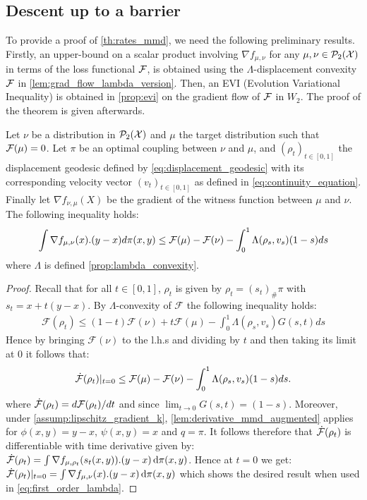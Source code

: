 \subsection{Descent up to a barrier}

To provide a proof of \cref{th:rates_mmd}, we need the following preliminary results. Firstly, an upper-bound on a scalar product involving $\nabla f_{\mu, \nu}$ for any $\mu, \nu \in \mathcal{P}_2({{\mathcal X}})$ in terms of the loss functional ${{\mathcal F}}$, is obtained using the $\Lambda$-displacement convexity ${{\mathcal F}}$ in \cref{lem:grad_flow_lambda_version}. Then, an EVI (Evolution Variational Inequality) is obtained in \cref{prop:evi} on the gradient flow of ${{\mathcal F}}$ in $W_2$. The proof of the theorem is given afterwards.


\begin{lemma}	\label{lem:grad_flow_lambda_version}
	Let $\nu$ be a distribution in $\mathcal{P}_2({{\mathcal X}})$ and $\mu$ the target distribution such that ${{\mathcal F}}(\mu)=0$.  Let $\pi$ be an optimal coupling between $\nu$ and $\mu$, and $(\rho_t)_{t \in [0,1]}$ the displacement geodesic defined by \cref{eq:displacement_geodesic} with its corresponding velocity vector  $(v_t)_{t\in[0,1]}$ as defined in \cref{eq:continuity_equation}. Finally let $\nabla f_{\nu,\mu}(X)$ be the gradient of the witness function between $\mu$ and $\nu$. The following inequality holds: %
	\begin{align*}
	\int \nabla f_{\mu, \nu}(x).(y-x) d\pi(x,y)
	\leq
	{{\mathcal F}}(\mu)- {{\mathcal F}}(\nu) -\int_0^1 \Lambda(\rho_s,v_s)(1-s)ds
	\end{align*}
	where $\Lambda$ is defined \cref{prop:lambda_convexity}.
\end{lemma}
\begin{proof}
	Recall that for all $t\in[0,1]$, $\rho_t$ is given by $\rho_t = (s_t)_{\#}\pi$ with $s_t = x + t(y-x)$. By $\Lambda$-convexity of $\mathcal{F}$ the following inequality holds:
	\begin{align*}
	\mathcal{F}(\rho_{t})\leq (1-t)\mathcal{F}(\nu)+t \mathcal{F}(\mu) - \int_0^1 \Lambda(\rho_s,v_s)G(s,t)ds
	\end{align*}
	Hence by bringing $\mathcal{F}(\nu)$ to the l.h.s and dividing by $t$ and then taking its limit at $0$ it follows that:
	\begin{align}\label{eq:first_order_lambda}
	\dot{{{\mathcal F}}}(\rho_t)\vert_{t=0}\leq \mathcal	{F}(\mu)-\mathcal{F}(\nu)-\int_0^1 \Lambda(\rho_s,v_s)(1-s)ds.	
	\end{align}
	where $\dot{{{\mathcal F}}}(\rho_t)=d{{\mathcal F}}(\rho_t)/dt$ and since $\lim_{t \rightarrow 0}G(s,t)=(1-s)$.
	Moreover, under \cref{assump:lipschitz_gradient_k}, \cref{lem:derivative_mmd_augmented} applies for $\phi(x,y) = y-x$, $\psi(x,y)= x$ and $q = \pi$. It follows therefore that $\dot{{{\mathcal F}}}(\rho_t)$ is differentiable with time derivative given by:
	$\dot{{{\mathcal F}}}(\rho_t) = \int \nabla f_{\mu,\rho_t}(s_t(x,y)).(y-x)\mathop{}\!\mathrm{d} \pi(x,y)$. Hence at $t=0$ we get: $\dot{{{\mathcal F}}}(\rho_t)\vert_{t=0} = \int \nabla f_{\mu,\nu}(x).(y-x)\mathop{}\!\mathrm{d} \pi(x,y)$ which shows the desired result when used in \cref{eq:first_order_lambda}.
\end{proof}


